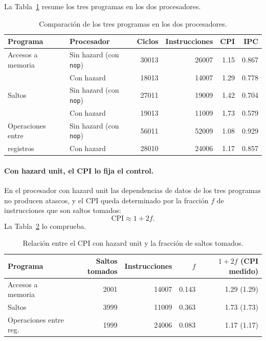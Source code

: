 \documentclass[11pt,a4paper]{article}
\begin{document}
La Tabla~\ref{tab:comparacion} resume los tres programas en los dos
procesadores.

\begin{table}[h]
  \centering
  \begin{tabular}{@{}llrrrr@{}}
    \toprule
    Programa & Procesador & Ciclos & Instrucciones & CPI & IPC \\
    \midrule
    Accesos a memoria & Sin hazard (con \texttt{nop}) & 30013 & 26007 & 1.15 & 0.867 \\
                      & Con hazard                    & 18013 & 14007 & 1.29 & 0.778 \\
    \midrule
    Saltos            & Sin hazard (con \texttt{nop}) & 27011 & 19009 & 1.42 & 0.704 \\
                      & Con hazard                    & 19013 & 11009 & 1.73 & 0.579 \\                 
    \midrule
    Operaciones entre & Sin hazard (con \texttt{nop}) & 56011 & 52009 & 1.08 & 0.929 \\
    registros         & Con hazard                    & 28010 & 24006 & 1.17 & 0.857 \\
    \bottomrule
  \end{tabular}
  \caption{Comparaci\'on de los tres programas en los dos procesadores.}
  \label{tab:comparacion}
\end{table}

\paragraph{Con hazard unit, el CPI lo fija el control.}
En el procesador con hazard unit las dependencias de datos de los tres programas
no producen atascos, y el CPI queda determinado por la fracci\'on $f$ de
instrucciones que son saltos tomados:
\begin{equation}
  \text{CPI} \approx 1 + 2f .
\end{equation}
La Tabla~\ref{tab:modelo_cpi} lo comprueba.

\begin{table}[h]
  \centering
  \begin{tabular}{@{}lrrrr@{}}
    \toprule
    Programa & Saltos tomados & Instrucciones & $f$ & $1 + 2f$ (CPI medido) \\
    \midrule
    Accesos a memoria        & 2001 & 14007 & 0.143 & 1.29 (1.29) \\
    Saltos                   & 3999 & 11009 & 0.363 & 1.73 (1.73) \\
    Operaciones entre reg.   & 1999 & 24006 & 0.083 & 1.17 (1.17) \\
    \bottomrule
  \end{tabular}
  \caption{Relaci\'on entre el CPI con hazard unit y la fracci\'on de saltos tomados.}
  \label{tab:modelo_cpi}
\end{table}
\end{document}
